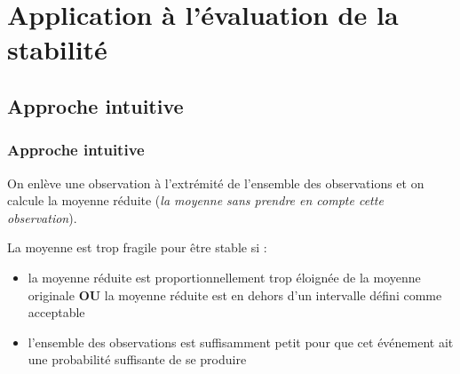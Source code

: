 \documentclass[handout]{beamer}
\begin{document}
	\section{Application à l'évaluation de la stabilité}

		\subsection{Approche intuitive}
		\begin{frame}
			\frametitle{Approche intuitive}
			On enlève une observation à l'extrémité de l'ensemble des observations et on calcule la moyenne réduite (\textit{la moyenne sans prendre en compte cette observation}).

			\vspace{15px}
			La moyenne est trop fragile pour être stable si :
			\begin{itemize}
				\item la moyenne réduite est proportionnellement trop éloignée de la moyenne originale \textbf{OU} la moyenne réduite est en dehors d'un intervalle défini comme acceptable
				\item l'ensemble des observations est suffisamment petit pour que cet événement ait une probabilité suffisante de se produire
			\end{itemize}
		\end{frame}


\end{document}
